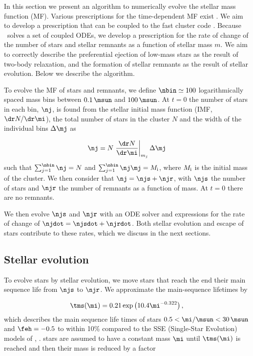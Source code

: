 

In this section we present an algorithm to numerically evolve the stellar mass
function (MF). Various prescriptions for the time-dependent MF exist
\citep[e.g.][]{2009A&A...507.1409K,2013MNRAS.433.1378L}. We aim to develop a
prescription that can be coupled to the fast cluster code \emacss. Because
\emacss\ solves a set of coupled ODEs, we develop a prescription for the rate of
change of the number of stars and stellar remnants  as a function of stellar
mass $m$. We aim to correctly describe the preferential ejection of low-mass
stars as the result of two-body relaxation, and the formation of stellar
remnants as the result of stellar evolution. Below we describe the algorithm.

To evolve the MF of  stars and remnants, we define $\nbin\simeq100$
logarithmically spaced mass bins between $0.1\,\msun$ and $100\,\msun$. At $t=0$
the number of stars in each bin, $\nj$, is found from the stellar initial mass
function (IMF, $\dr N/\dr\mi$), the total number of stars in the cluster $N$ and
the width of the individual bins $\Delta \mj$ as

\begin{equation}
\nj= N \left.\frac{\dr N}{\dr\mi}\right|_{m_j} \Delta \mj
\end{equation}
such that $\sum_{j=1}^{\nbin} \nj = N$ and $\sum_{j=1}^{\nbin} \nj\mj = M_{\rm
i}$, where $M_{\rm i}$ is the initial mass of the cluster. We then consider that
$\nj = \njs  + \njr$, with $\njs$ the number of stars and $\njr$ the number of
remnants as a function of mass. At $t=0$ there are no remnants. 

We then evolve $\njs$ and $\njr$ with an ODE solver and expressions for the rate
of change of $\njdot = \njsdot + \njrdot$. Both stellar evolution and escape of
stars contribute to these rates, which we discuss in the next sections. 


\subsection{Stellar evolution}
\label{ssec:sev}
To  evolve stars by stellar evolution, we move stars that reach the end their
main sequence life from $\njs$ to $\njr$.  We approximate  the main-sequence
lifetimes by

\begin{equation}
\tms(\mi) = 0.21\exp\left(10.4\mi^{-0.322}\right),
\label{eq:tms}
\end{equation}
which describes the main sequence life times of stars $0.5<\mi/\msun<30\,\msun$
and $\feh=-0.5$ to within 10\% compared to the SSE (Single-Star Evolution)
models of \citet{2000MNRAS.315..543H}, .  stars are assumed to
have a constant mass $\mi$ until $\tms(\mi)$ is reached and then their mass is
reduced by a factor

